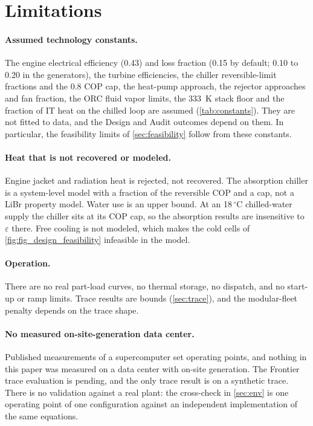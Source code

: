 \section{Limitations}\label{sec:limits}

\paragraph{Assumed technology constants.}
The engine electrical efficiency (0.43) and loss fraction (0.15 by default; 0.10 to 0.20 in the generators), the turbine efficiencies, the chiller reversible-limit fractions and the 0.8 COP cap, the heat-pump approach, the rejector approaches and fan fraction, the ORC fluid
vapor limits, the 333~K stack floor and the fraction of IT heat on the chilled loop are assumed (\cref{tab:constants}). They are not fitted to data, and the Design and Audit outcomes depend on them. In particular, the feasibility limits of \cref{sec:feasibility} follow from these constants.

\paragraph{Heat that is not recovered or modeled.}
Engine jacket and radiation heat is rejected, not recovered. The absorption chiller is a system-level model with a fraction of the reversible COP and a cap, not a LiBr property model.
Water use is an upper bound. At an 18\,$^\circ$C chilled-water supply the chiller sits at its COP cap, so the absorption results are insensitive to $\varepsilon$ there. Free cooling is not modeled, which makes the cold cells of \cref{fig:fig_design_feasibility} infeasible in the model.

\paragraph{Operation.}
There are no real part-load curves, no thermal storage, no dispatch, and no start-up or ramp limits. Trace results are bounds (\cref{sec:trace}), and the modular-fleet penalty depends on the trace shape.

\paragraph{No measured on-site-generation data center.}
Published measurements of a supercomputer set operating points, and nothing in this paper was measured on a data center with on-site generation. The Frontier trace evaluation is pending, and the only trace result is on a synthetic trace. There is no validation against a real plant: the cross-check in \cref{sec:env} is one operating point of one configuration against an independent implementation of the same equations.

